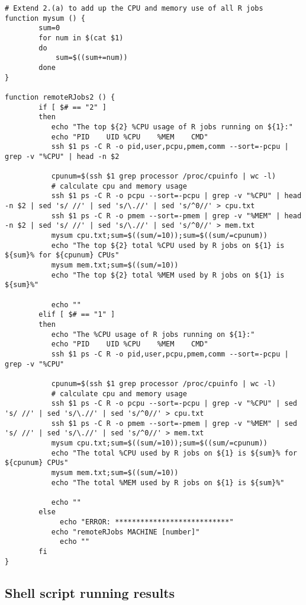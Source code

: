 \documentclass{article}
\begin{document}
\begin{lstlisting}
# Extend 2.(a) to add up the CPU and memory use of all R jobs
function mysum () {
		sum=0
		for num in $(cat $1)
		do
			sum=$((sum+=num))
		done
}

function remoteRJobs2 () {
		if [ $# == "2" ]
		then 
		   echo "The top ${2} %CPU usage of R jobs running on ${1}:" 
		   echo "PID	UID	%CPU	%MEM	CMD"
		   ssh $1 ps -C R -o pid,user,pcpu,pmem,comm --sort=-pcpu | grep -v "%CPU" | head -n $2
		   
		   cpunum=$(ssh $1 grep processor /proc/cpuinfo | wc -l)
		   # calculate cpu and memory usage
		   ssh $1 ps -C R -o pcpu --sort=-pcpu | grep -v "%CPU" | head -n $2 | sed 's/ //' | sed 's/\.//' | sed 's/^0//' > cpu.txt
		   ssh $1 ps -C R -o pmem --sort=-pmem | grep -v "%MEM" | head -n $2 | sed 's/ //' | sed 's/\.//' | sed 's/^0//' > mem.txt
		   mysum cpu.txt;sum=$((sum/=10));sum=$((sum/=cpunum))
		   echo "The top ${2} total %CPU used by R jobs on ${1} is ${sum}% for ${cpunum} CPUs"
		   mysum mem.txt;sum=$((sum/=10))
		   echo "The top ${2} total %MEM used by R jobs on ${1} is ${sum}%"
		   
		   echo ""
		elif [ $# == "1" ]
		then 
		   echo "The %CPU usage of R jobs running on ${1}:" 
		   echo "PID	UID	%CPU	%MEM	CMD"
		   ssh $1 ps -C R -o pid,user,pcpu,pmem,comm --sort=-pcpu | grep -v "%CPU"
		   
		   cpunum=$(ssh $1 grep processor /proc/cpuinfo | wc -l)
		   # calculate cpu and memory usage
		   ssh $1 ps -C R -o pcpu --sort=-pcpu | grep -v "%CPU" | sed 's/ //' | sed 's/\.//' | sed 's/^0//' > cpu.txt
		   ssh $1 ps -C R -o pmem --sort=-pmem | grep -v "%MEM" | sed 's/ //' | sed 's/\.//' | sed 's/^0//' > mem.txt
		   mysum cpu.txt;sum=$((sum/=10));sum=$((sum/=cpunum))
		   echo "The total %CPU used by R jobs on ${1} is ${sum}% for ${cpunum} CPUs"
		   mysum mem.txt;sum=$((sum/=10))
		   echo "The total %MEM used by R jobs on ${1} is ${sum}%"
		   
		   echo ""
		else
			 echo "ERROR: ***************************"
		   echo "remoteRJobs MACHINE [number]"
			 echo ""
		fi 
}
\end{lstlisting}

\subsection*{Shell script running results}




\newpage
\end{document}
